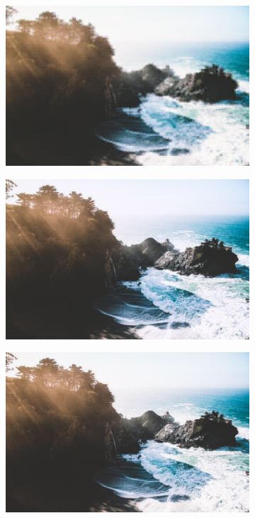 \documentclass{article}
\begin{document}
\begin{figure}
    \centering
    \begin{subfigure}[b]{0.49 \textwidth}
    \includegraphics[width=\textwidth]{Images/autoencoder/reconstructed/500/test1_10.png}
    \end{subfigure}
    \centering
    \begin{subfigure}[b]{0.49 \textwidth}
    \includegraphics[width=\textwidth]{Images/autoencoder/reconstructed/500/test1_80.png}
    \end{subfigure}
    \begin{subfigure}[b]{0.49 \textwidth}
    \includegraphics[width=\textwidth]{Images/autoencoder/reconstructed/500/test1_90.png}

\end{subfigure}
\end{figure}
\end{document}
